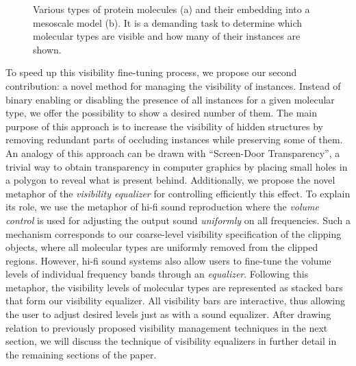 \begin{figure}[t]
\centering
{}
\caption{\label{fig:which} Various types of protein molecules (a) and their embedding into a mesoscale  model (b). It is a demanding task to determine which molecular types are visible and how many of their instances are shown.}
\end{figure}


To speed up this visibility fine-tuning process, we propose our second contribution: a novel method for managing the visibility of instances. Instead of binary enabling or disabling the presence of all instances for a given molecular type, we offer the possibility to show a desired number of them.
The main purpose of this approach is to increase the visibility of hidden structures by removing redundant parts of occluding instances while preserving some of them.
An analogy of this approach can be drawn with ``Screen-Door Transparency'', a trivial way to obtain transparency in computer graphics by placing small holes in a polygon to reveal what is present behind.
Additionally, we propose the novel metaphor of the \emph{visibility equalizer} for controlling efficiently this effect.
To explain its role, we use the metaphor of hi-fi sound reproduction where the \textit{volume control} is used for adjusting the output sound \textit{uniformly} on all frequencies. 
Such a mechanism corresponds to our coarse-level visibility specification of the clipping objects, where all molecular types are uniformly removed from the clipped regions.
However, hi-fi sound systems also allow users to fine-tune the volume levels of individual frequency bands through an \emph{equalizer}.
Following this metaphor, the visibility levels of molecular types are represented as stacked bars that form our visibility equalizer.
All visibility bars are interactive, thus allowing the user to adjust desired levels just as with a sound equalizer. After drawing relation to previously proposed visibility management techniques in the next section, we will discuss the technique of visibility equalizers in further detail in the remaining sections of the paper.
